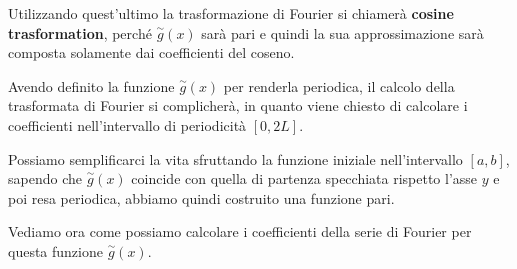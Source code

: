 Utilizzando quest'ultimo la trasformazione di Fourier si chiamerà \textbf{cosine trasformation},
perché $\stackrel{\sim}{g}(x)$ sarà pari e quindi la sua approssimazione sarà
composta solamente dai coefficienti del coseno.

Avendo definito la funzione $\stackrel{\sim}{g}(x)$ per renderla periodica, il
calcolo della trasformata di Fourier si complicherà, in quanto viene chiesto di
calcolare i coefficienti nell'intervallo di periodicità $[0, 2L]$.

Possiamo semplificarci la vita sfruttando la funzione iniziale nell'intervallo
$[a,b]$, sapendo che $\stackrel{\sim}{g}(x)$ coincide con quella di partenza
specchiata rispetto l'asse $y$ e poi resa periodica, abbiamo quindi costruito una
funzione pari.

Vediamo ora come possiamo calcolare i coefficienti della serie di Fourier per
questa funzione $\stackrel{\sim}{g}(x)$.

